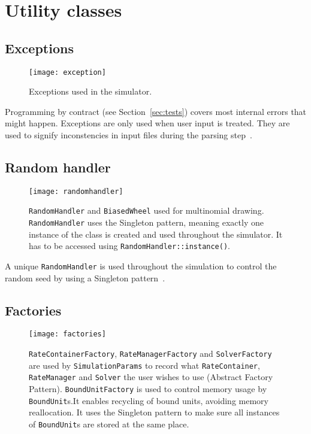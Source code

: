 
\section{Utility classes}

\subsection{Exceptions}

\begin{figure}[!h]
  \centering
  \texttt{[image: exception]}
  \caption{Exceptions used in the simulator.}
  \label{fig:exception}
\end{figure}

Programming by contract (see Section~\ref{sec:tests}) covers most internal errors that might happen. Exceptions are only used when user input is treated. They are used to signify inconstencies in input files during the parsing step~.

\subsection{Random handler}

\begin{figure}[!h]
  \centering
  \texttt{[image: randomhandler]}
  \caption{\texttt{RandomHandler} and \texttt{BiasedWheel} used for multinomial drawing. \texttt{RandomHandler} uses the Singleton pattern, meaning exactly one instance of the class is created and used throughout the simulator. It has to be accessed using \texttt{RandomHandler::instance()}.}
  \label{fig:random_handler}
\end{figure}

A unique \texttt{RandomHandler} is used throughout the simulation to control the random seed by using a Singleton pattern~.

\subsection{Factories}

\begin{figure}[!h]
  \centering
  \texttt{[image: factories]}
  \caption{\texttt{RateContainerFactory}, \texttt{RateManagerFactory} and \texttt{SolverFactory} are used by \texttt{SimulationParams} to record what \texttt{RateContainer}, \texttt{RateManager} and \texttt{Solver} the user wishes to use (Abstract Factory Pattern). \texttt{BoundUnitFactory} is used to control memory usage by \texttt{BoundUnit}s.It enables recycling of bound units, avoiding memory reallocation. It uses the Singleton pattern to make sure all instances of \texttt{BoundUnit}s are stored at the same place.}
  \label{fig:factories}
\end{figure}

